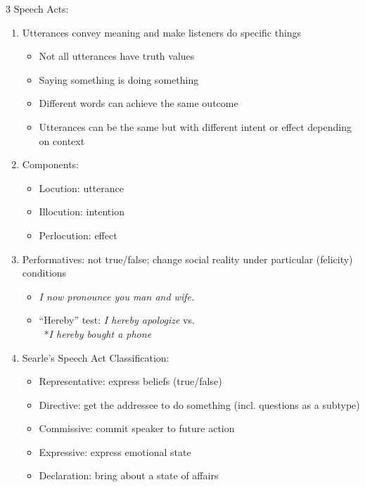 \documentclass[12pt, a4paper]{article}
\begin{document}
\begin{multicols*}{3}
Speech Acts:
\begin{enumerate}[\roman*.]
  \item Utterances convey meaning and make listeners do specific things 
    \begin{itemize}[leftmargin=*]\vspace{3pt}
      \item Not all utterances have truth values
      \item Saying something is doing something
      \item Different words can achieve the same outcome
      \item Utterances can be the same but with different intent or effect depending on context
    \end{itemize}
  \item Components:
    \begin{itemize}[leftmargin=*]\vspace{3pt}
      \item Locution: utterance
      \item Illocution: intention
      \item Perlocution: effect
    \end{itemize}
  \item Performatives: not true/false; change social reality under particular (felicity) conditions 
    \begin{itemize}[leftmargin=*]\vspace{3pt}
      \item \textit{I now pronounce you man and wife.}
      \item ``Hereby'' test: \textit{I hereby apologize} vs.\\\ *\textit{I hereby bought a phone}
    \end{itemize}
  \item Searle's Speech Act Classification:
    \begin{itemize}[leftmargin=*]\vspace{3pt}
      \item Representative: express beliefs (true/false)
      \item Directive: get the addressee to do something (incl. questions as a subtype)
      \item Commissive: commit speaker to future action
      \item Expressive: express emotional state
      \item Declaration: bring about a state of affairs
    \end{itemize}
\end{enumerate}


\end{multicols*}
\end{document}
